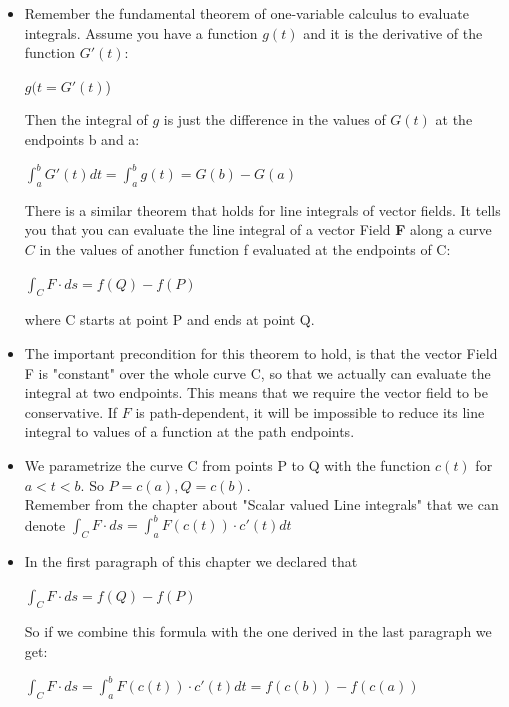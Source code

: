 \documentclass[12pt,a4paper]{article}
\begin{document}
	\begin{itemize}
		\item Remember the fundamental theorem of one-variable calculus to evaluate integrals. Assume you have a function $g(t)$ and it is the derivative of the function $G'(t)$:\\
		\begin{center}
			$g(t = G'(t)$)
		\end{center}
		Then the integral of $g$ is just the difference in the values of $G(t)$ at the endpoints b and a:\\
		\begin{center}
			$\int_{a}^{b} G'(t) dt =\int_{a}^{b} g(t) = G(b) - G(a)$
		\end{center}
		There is a similar theorem that holds for line integrals of vector fields. It tells you that you can evaluate the line integral of a vector Field \textbf{F} along a curve $C$ in the values of another function f evaluated at the endpoints of C:\\
		\begin{center}
			$\int_{C}^{}F \cdot ds = f(Q) - f(P)$
		\end{center}
		where C starts at point P and ends at point Q. 
		
		\item The important precondition for this theorem to hold, is that the vector Field F is "constant" over the whole curve C, so that we actually can evaluate the integral at two endpoints. This means that we require the vector field to be conservative. If $F$ is path-dependent, it will be impossible to reduce its line integral to values of a function at the path endpoints. 
		
		\item We parametrize the curve C from points P to Q with the function $c(t)$ for $a < t < b$. So $P = c(a), Q = c(b)$. \\
		Remember from the chapter about "Scalar valued Line integrals" that we can denote $\int_{C}^{} F\cdot ds = \int_{a}^{b} F(c(t))\cdot c'(t) dt$
		
		\item In the first paragraph of this chapter we declared that\\
		\begin{center}
			$\int_{C}^{}F \cdot ds = f(Q) - f(P)$
		\end{center}
		So if we combine this formula with the one derived in the last paragraph we get:\\
		\begin{center}
			$\int_{C}^{}F \cdot ds = \int_{a}^{b} F(c(t)) \cdot c'(t)dt = f(c(b)) - f(c(a))$
		\end{center} 
		

\end{itemize}
\end{document}

